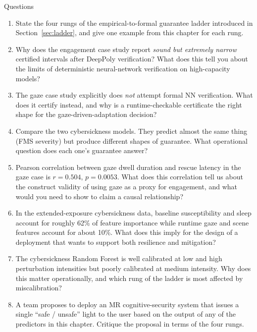 \documentclass[graybox]{svmult}
\begin{document}
\begin{trailer}{Questions}
\begin{enumerate}
\item State the four rungs of the empirical-to-formal guarantee ladder introduced in Section~\ref{sec:ladder}, and give one example from this chapter for each rung.
\item Why does the engagement case study report \emph{sound but extremely narrow} certified intervals after DeepPoly verification? What does this tell you about the limits of deterministic neural-network verification on high-capacity models?
\item The gaze case study explicitly does \emph{not} attempt formal NN verification. What does it certify instead, and why is a runtime-checkable certificate the right shape for the gaze-driven-adaptation decision?
\item Compare the two cybersickness models. They predict almost the same thing (FMS severity) but produce different shapes of guarantee. What operational question does each one's guarantee answer?
\item Pearson correlation between gaze dwell duration and rescue latency in the gaze case is $r=0.504$, $p=0.0053$. What does this correlation tell us about the construct validity of using gaze as a proxy for engagement, and what would you need to show to claim a causal relationship?
\item In the extended-exposure cybersickness data, baseline susceptibility and sleep account for roughly 62\% of feature importance while runtime gaze and scene features account for about 10\%. What does this imply for the design of a deployment that wants to support both resilience and mitigation?
\item The cybersickness Random Forest is well calibrated at low and high perturbation intensities but poorly calibrated at medium intensity. Why does this matter operationally, and which rung of the ladder is most affected by miscalibration?
\item A team proposes to deploy an MR cognitive-security system that issues a single ``safe / unsafe'' light to the user based on the output of any of the predictors in this chapter. Critique the proposal in terms of the four rungs.
\end{enumerate}
\end{trailer}
\end{document}
